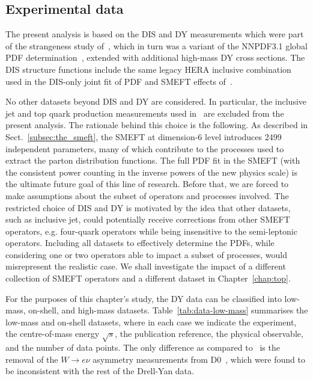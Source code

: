 \documentclass[withindex,glossary]{cam-thesis}
\begin{document}
\subsection{Experimental data}
\label{sec:dy_dataset}

The present analysis is based on the DIS and DY measurements which were part of
the strangeness study of~\cite{Faura:2020oom}, which in turn was a variant of the
NNPDF3.1 global PDF determination~\cite{Ball:2017nwa}, extended with additional high-mass
DY cross sections.
%
The DIS structure functions include the same legacy HERA inclusive combination~\cite{Abramowicz:2015mha}
used in the DIS-only joint fit of PDF and SMEFT effects of~\cite{Carrazza:2019sec}.

No other datasets beyond DIS and DY are considered.
In particular, the inclusive jet and top quark production
measurements used in~\cite{Faura:2020oom} are excluded from the
present analysis.
%
The rationale behind this choice is the following.
As described in Sect.~\ref{subsec:the_smeft}, the SMEFT at dimension-6 level introduces 2499 independent parameters,
many of which contribute to the processes used to extract the parton
distribution functions. The full PDF fit in the SMEFT (with the
consistent power counting in the inverse powers of the new physics
scale) is the ultimate future goal of this line of research. Before
that, we are forced to make assumptions about the subset of operators
and processes involved. The restricted choice of DIS and DY is
motivated by the idea that other datasets, such as inclusive jet,
could potentially receive corrections from other SMEFT operators,
e.g. four-quark operators while being insensitive to the semi-leptonic
operators. Including all datasets to effectively determine the PDFs, while
considering one or two operators able to impact a subset of processes,
would misrepresent the realistic case. We shall investigate the impact of 
a different collection of SMEFT operators and a different dataset in Chapter~\ref{chap:top}.

%

For the purposes of this chapter's study, the DY data can be classified into low-mass,
on-shell, and high-mass datasets.
%
Table~\ref{tab:data-low-mass} summarises
the low-mass and on-shell datasets, where in 
each case we indicate the experiment, the centre-of-mass energy $\sqrt{s}$,
the publication reference, the physical observable, and the number of data points.
%
The only difference as compared to~\cite{Faura:2020oom} is the removal of the $W\to e\nu$
asymmetry measurements from D0~\cite{D0:2014kma}, which were found to be inconsistent
with the rest of the Drell-Yan data.
\end{document}
